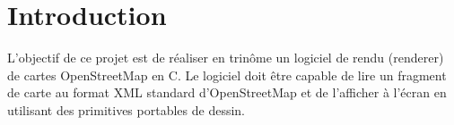 \section{Introduction}

L'objectif de ce projet est de réaliser en trinôme un logiciel de rendu (renderer)
de cartes OpenStreetMap en C. Le logiciel doit être capable de lire un fragment de carte
au format XML standard d'OpenStreetMap et de l'afficher à l'écran en utilisant des primitives
portables de dessin.
